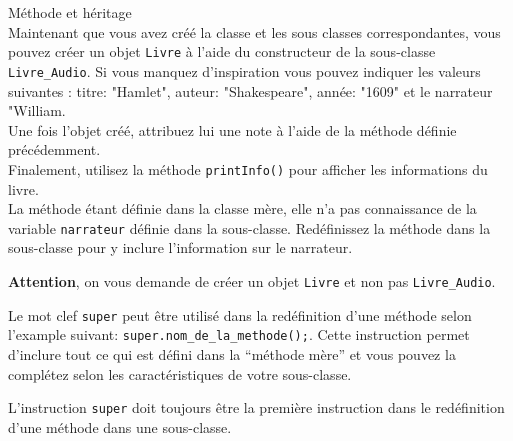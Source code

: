 \begin{Exercice}[5 minutes] Méthode et héritage \\

Maintenant que vous avez créé la classe et les sous classes correspondantes, vous pouvez créer un objet \lstinline{Livre} à l'aide du constructeur de la sous-classe \lstinline{Livre_Audio}. 
Si vous manquez d'inspiration vous pouvez indiquer les valeurs suivantes : titre: "Hamlet", auteur: "Shakespeare", année: "1609" et le narrateur "William.\\

Une fois l'objet créé, attribuez lui une note à l'aide de la méthode définie précédemment.\\ 

Finalement, utilisez la méthode \lstinline{printInfo()} pour afficher les informations du livre.\\

La méthode étant définie dans la classe mère, elle n'a pas connaissance de la variable \lstinline{narrateur} définie dans la sous-classe. Redéfinissez la méthode dans la sous-classe pour y inclure l'information sur le narrateur. \\

\begin{conseil}
\textbf{Attention}, on vous demande de créer un objet \lstinline{Livre} et non pas \lstinline{Livre_Audio}.

Le mot clef \lstinline{super} peut être utilisé dans la redéfinition d'une méthode selon l'example suivant: \lstinline{super.nom_de_la_methode();}. Cette instruction permet  d'inclure tout ce qui est défini dans la ``méthode mère'' et vous pouvez la complétez selon les caractéristiques de votre sous-classe.

L'instruction \lstinline{super} doit toujours être la première instruction dans le redéfinition d'une méthode dans une sous-classe. 
\end{conseil}

\begin{solution}
	
	
\end{solution}

\end{Exercice}

